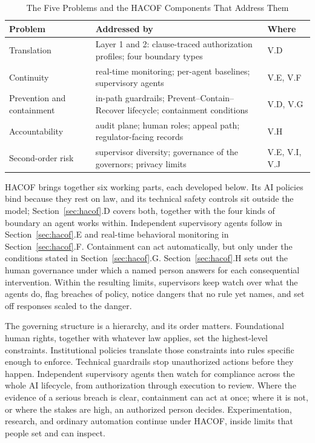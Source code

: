 \documentclass{ieeeaccess}
\newcommand{\hacof}{HACOF}
\begin{document}
\begin{table}[!t]
\caption{The Five Problems and the \hacof{} Components That Address Them}
\label{tab:problems}
\centering
\footnotesize
\setlength{\tabcolsep}{3pt}
\begin{tabular}{>{\raggedright\arraybackslash}p{1.9cm}>{\raggedright\arraybackslash}p{3.6cm}>{\raggedright\arraybackslash}p{1.6cm}}
\toprule
\rowcolor{darkblue!15}
\textbf{Problem} & \textbf{Addressed by} & \textbf{Where} \\
\midrule
Translation & Layer 1 and 2: clause-traced authorization profiles; four boundary types & V.D \\
\rowcolor{darkblue!5}
Continuity & real-time monitoring; per-agent baselines; supervisory agents & V.E, V.F \\
Prevention and containment & in-path guardrails; Prevent--Contain--Recover lifecycle; containment conditions & V.D, V.G \\
\rowcolor{darkblue!5}
Accountability & audit plane; human roles; appeal path; regulator-facing records & V.H \\
Second-order risk & supervisor diversity; governance of the governors; privacy limits & V.E, V.I, V.J \\
\bottomrule
\end{tabular}
\end{table}

\hacof{} brings together six working parts, each developed below. Its AI policies bind because they rest on law, and its technical safety controls sit outside the model; Section~\ref{sec:hacof}.D covers both, together with the four kinds of boundary an agent works within. Independent supervisory agents follow in Section~\ref{sec:hacof}.E and real-time behavioral monitoring in Section~\ref{sec:hacof}.F. Containment can act automatically, but only under the conditions stated in Section~\ref{sec:hacof}.G. Section~\ref{sec:hacof}.H sets out the human governance under which a named person answers for each consequential intervention. Within the resulting limits, supervisors keep watch over what the agents do, flag breaches of policy, notice dangers that no rule yet names, and set off responses scaled to the danger.

The governing structure is a hierarchy, and its order matters. Foundational human rights, together with whatever law applies, set the highest-level constraints. Institutional policies translate those constraints into rules specific enough to enforce. Technical guardrails stop unauthorized actions before they happen. Independent supervisory agents then watch for compliance across the whole AI lifecycle, from authorization through execution to review. Where the evidence of a serious breach is clear, containment can act at once; where it is not, or where the stakes are high, an authorized person decides. Experimentation, research, and ordinary automation continue under \hacof{}, inside limits that people set and can inspect.
\end{document}
